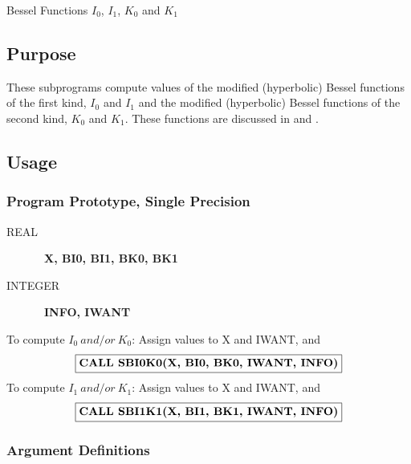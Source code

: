 \documentclass[twoside]{MATH77}
\begin{document}
 Bessel Functions $I_0$, $I_1$, $K_0$ and $K_1$


\subsection{Purpose}

These subprograms compute values of the modified (hyperbolic) Bessel
functions of the first kind, $I_0$ and $I_{1}$ and the modified
(hyperbolic) Bessel functions of the second kind, $K_0$ and $K_1$. These
functions are discussed in \cite{ams55} and \cite{Hart:1968:CA:bes}.

\subsection{Usage}

\subsubsection{Program Prototype, Single Precision}

\begin{description}
\item[REAL]  \ {\bf X, BI0, BI1, BK0, BK1}

\item[INTEGER]  \ {\bf INFO, IWANT}
\end{description}

To compute $I_0\ and/or\ K_0$:\newline
Assign values to X and IWANT, and
$$
\fbox{{\bf CALL SBI0K0(X, BI0, BK0, IWANT, INFO)}}
$$
To compute $I_1\ and/or\ K_1$:\newline
Assign values to X and IWANT, and
$$
\fbox{{\bf CALL SBI1K1(X, BI1, BK1, IWANT, INFO)}}
$$

\subsubsection{Argument Definitions}
\end{document}

